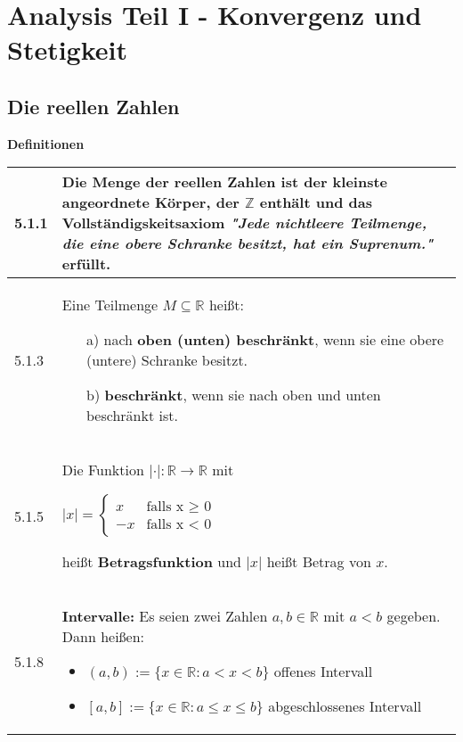 \section{Analysis Teil I - Konvergenz und Stetigkeit}
\subsection{Die reellen Zahlen}
\noindent
\textbf{Definitionen} 
\begin{table}[H]  
\begin{tabularx}{\textwidth}{X m{16cm}}
    \toprule
    
    5.1.1 & Die \textbf{Menge der reellen Zahlen} ist der kleinste angeordnete Körper, 
            der $\mathbb{Z}$ enthält und das Vollständigskeitsaxiom 
            \textit{"Jede nichtleere Teilmenge, die eine obere Schranke besitzt, hat ein Suprenum."}
            erfüllt. \\
    \midrule
    5.1.3 & Eine Teilmenge $M \subseteq \mathbb{R}$ heißt:
            \begin{itemize}[topsep=-0.5cm]
                \item[a)] nach \textbf{oben (unten) beschränkt}, wenn sie eine obere (untere) Schranke besitzt.
                \item[b)] \textbf{beschränkt}, wenn sie nach oben und unten beschränkt ist. 
            \end{itemize} \vspace{-0cm} \\
    \midrule
    5.1.5 & Die Funktion $|\cdot|: \mathbb{R} \rightarrow \mathbb{R}$ mit \hfill \break
            \centerline{    
                $|x| =  \begin{cases}
                x & \text{falls x $\geq$ 0} \\
                -x & \text{falls x < 0}
               \end{cases}$
            } \hfill \break
            heißt \textbf{Betragsfunktion} und $|x|$ heißt Betrag von $x$. \\
    \midrule
    5.1.8 & \textbf{Intervalle:} \hfill \break 
            Es seien zwei Zahlen $a,b \in \mathbb{R}$ mit $a < b$ gegeben. Dann heißen:
            \begin{itemize}[topsep=-0.5cm]
                \item $(a,b):= \{x \in \mathbb{R}: a < x < b\}$ offenes Intervall
                \item $[a,b]:= \{x \in \mathbb{R}: a \leq x \leq b\}$ abgeschlossenes Intervall

\end{itemize}
\end{tabularx}
\end{table}
